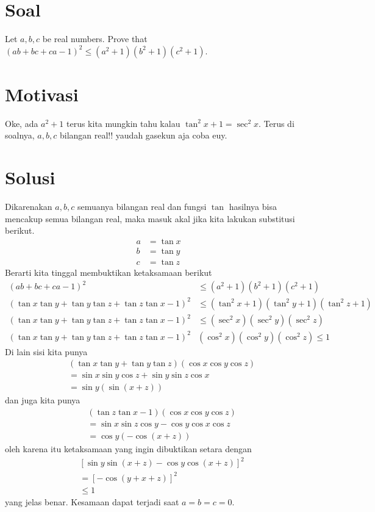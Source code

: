     \title{}
    \author{\large Solution by Azzam L. H.}
\maketitle

\section{Soal}
Let $a,b,c$ be real numbers. Prove that $(ab+bc+ca-1)^2 \leq (a^2+1)(b^2+1)(c^2+1)$.

\newpage
\section{Motivasi}
Oke, ada $a^2+1$ terus kita mungkin tahu kalau $\tan^2 x + 1 = \sec ^2 x$. Terus di soalnya, $a,b,c$ bilangan real!! yaudah gasekun aja coba euy.

\section{Solusi}
Dikarenakan $a,b,c$ semuanya bilangan real dan fungsi $\tan$ hasilnya bisa mencakup semua bilangan real, maka masuk akal jika kita lakukan substitusi berikut.
\begin{align*}
a &= \tan x \\
b &= \tan y \\
c &= \tan z
\end{align*}
Berarti kita tinggal membuktikan ketaksamaan berikut
\begin{align*}
(ab+bc+ca-1)^2 &\leq (a^2+1)(b^2+1)(c^2+1)\\
(\tan x \tan y + \tan y \tan z + \tan z \tan x - 1)^2 &\leq (\tan^2 x + 1)(\tan^2 y + 1)(\tan^2 z + 1)\\
(\tan x \tan y + \tan y \tan z + \tan z \tan x - 1)^2 &\leq (\sec^2 x)(\sec^2 y)(\sec^2 z) \\
(\tan x \tan y + \tan y \tan z + \tan z \tan x - 1)^2& (\cos^2 x)(\cos^2 y)(\cos^2 z) \leq 1
\end{align*}
Di lain sisi kita punya
\begin{align*}
&(\tan x \tan y + \tan y \tan z)(\cos x \cos y \cos z) \\
&= \sin x \sin y \cos z + \sin y \sin z \cos x \\
&= \sin y (\sin(x+z))
\end{align*}
dan juga kita punya
\begin{align*}
&(\tan z \tan x - 1)(\cos x \cos y \cos z) \\
&= \sin x \sin z \cos y - \cos y \cos x \cos z \\
&= \cos y (-\cos(x+z))
\end{align*}
oleh karena itu ketaksamaan yang ingin dibuktikan setara dengan
\begin{align*}
&\left[ \sin y \sin(x+z) - \cos y \cos(x+z) \right]^2\\
&= \left[ -\cos(y+x+z) \right]^2 \\
&\leq 1
\end{align*}
yang jelas benar. Kesamaan dapat terjadi saat $a=b=c=0$.
